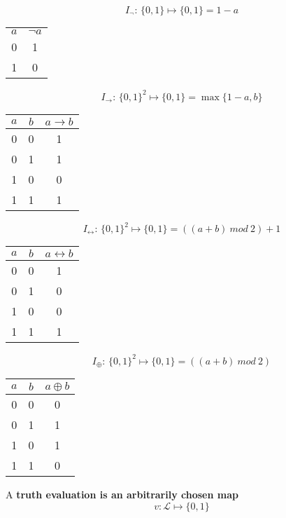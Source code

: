 	$$ I_{\neg} : \, \{0,1\} \mapsto \{0,1\} = 1 - a $$
	\begin{center}
		\begin{tabular}{c | c}
			$a$ & $\neg a$ \\
			0 & 1 \\
			1 & 0
		\end{tabular}
	\end{center}

	$$ I_{\rightarrow} : \, \{0,1\}^2 \mapsto \{0,1\} = \max\{1-a, b\}$$
	\begin{center}
		\begin{tabular}{c c | c}
			$a$ & $b$ & $a \rightarrow b$ \\
			\hline
			0 & 0 & 1 \\
			0 & 1 & 1 \\
			1 & 0 & 0 \\
			1 & 1 & 1
		\end{tabular}
	\end{center}

	$$ I_{\leftrightarrow} : \, \{0,1\}^2 \mapsto \{0,1\} = ((a+b) \ mod \ 2)+1 $$
	\begin{center}
		\begin{tabular}{c c | c}
			$a$ & $b$ & $a \leftrightarrow b$ \\
			\hline
			0 & 0 & 1 \\
			0 & 1 & 0\\
			1 & 0 & 0\\
			1 & 1 & 1
		\end{tabular}
	  \end{center}

	 $$ I_{\oplus} : \, \{0,1\}^2 \mapsto \{0,1\} = ((a+b) \ mod \ 2) $$
	\begin{center}
		\begin{tabular}{c c | c}
			$a$ & $b$ & $a \oplus b$ \\
			\hline
			0 & 0 & 0 \\
			0 & 1 & 1\\
			1 & 0 & 1\\
			1 & 1 & 0
		\end{tabular}
	\end{center}

	\begin{definition} A \textbf{truth evaluation is an arbitrarily chosen map}
	$$v: \mathcal{L} \mapsto \{0,1\}$$
  \end{definition}

